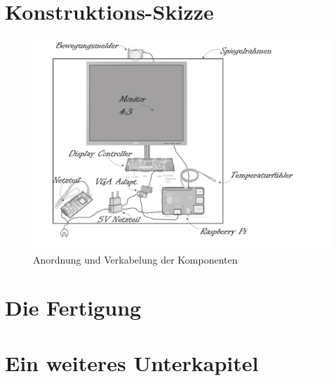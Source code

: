 \section{Konstruktions-Skizze}
\begin{figure}[H]
		\includegraphics[scale=0.5, trim=0mm 10mm 85mm 10mm]{bilder/smartMirrorExplosionsskizze.pdf}
	\caption{Anordnung und Verkabelung der Komponenten}
\end{figure}

\section{Die Fertigung}
\section{Ein weiteres Unterkapitel}